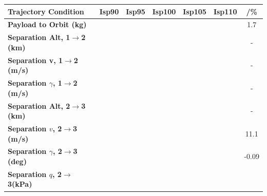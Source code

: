 \begin{table}[ht]
	\centering
	\begin{tabular}{l c c c c c c} 
		\hline \textbf{Trajectory Condition}
		&Isp90
		&Isp95
		&Isp100
		&Isp105
		&Isp110
		& /\%
		\\
		\hline \textbf{Payload to Orbit (kg)}
		& \PayloadToOrbitIspNinety
		& \PayloadToOrbitIspNinetyFive
		& \PayloadToOrbitIspStandard
		& \PayloadToOrbitIspOneHundredFive
		& \PayloadToOrbitIspOneHundredTen
		&1.7
		\\
		\textbf{Separation Alt, 1$\rightarrow$2 (km)}
		& \firstsecondSeparationAltIspNinety
		& \firstsecondSeparationAltIspNinetyFive
		& \firstsecondSeparationAltIspStandard
		& \firstsecondSeparationAltIspOneHundredFive
		& \firstsecondSeparationAltIspOneHundredTen
		& -
		\\
		\textbf{Separation v, 1$\rightarrow$2 (m/s)}
		& \firstsecondSeparationvIspNinety
		& \firstsecondSeparationvIspNinetyFive
		& \firstsecondSeparationvIspStandard
		& \firstsecondSeparationvIspOneHundredFive
		& \firstsecondSeparationvIspOneHundredTen
		& -
		\\
		\textbf{Separation $\gamma$, 1$\rightarrow$2 (m/s)}
		& \firstsecondSeparationgammaIspNinety
		& \firstsecondSeparationgammaIspNinetyFive
		& \firstsecondSeparationgammaIspStandard
		& \firstsecondSeparationgammaIspOneHundredFive
		& \firstsecondSeparationgammaIspOneHundredTen
		& -
		\\
		\textbf{Separation Alt, 2$\rightarrow$3 (km)}
		& \secondthirdSeparationAltIspNinety
		& \secondthirdSeparationAltIspNinetyFive
		& \secondthirdSeparationAltIspStandard
		& \secondthirdSeparationAltIspOneHundredFive
		& \secondthirdSeparationAltIspOneHundredTen
		& -
		\\
		\textbf{Separation $v$, 2$\rightarrow$3 (m/s)}
		& \secondthirdSeparationvIspNinety
		& \secondthirdSeparationvIspNinetyFive
		& \secondthirdSeparationvIspStandard
		& \secondthirdSeparationvIspOneHundredFive
		& \secondthirdSeparationvIspOneHundredTen
		&11.1
		\\
		\textbf{Separation $\gamma$, 2$\rightarrow$3 (deg)}
		& \secondthirdSeparationgammaIspNinety
		& \secondthirdSeparationgammaIspNinetyFive
		& \secondthirdSeparationgammaIspStandard
		& \secondthirdSeparationgammaIspOneHundredFive
		& \secondthirdSeparationgammaIspOneHundredTen
		&-0.09
		\\
		\textbf{Separation $q$, 2$\rightarrow$3(kPa)}
		& \secondthirdSeparationqIspNinety
		& \secondthirdSeparationqIspNinetyFive
		& \secondthirdSeparationqIspStandard

\end{tabular}
\end{table}
